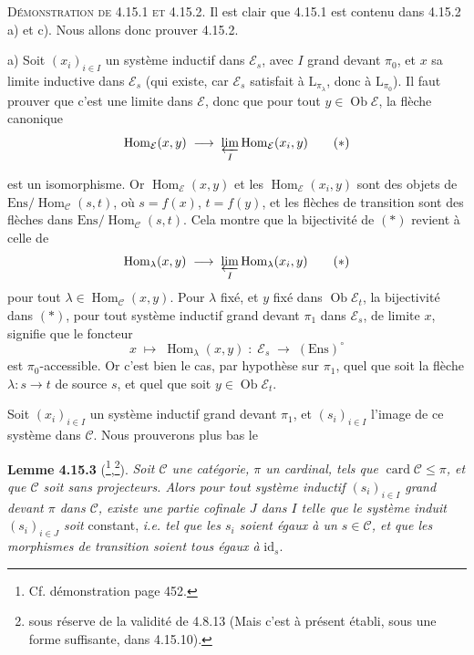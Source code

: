 \documentclass[11pt]{article}
\newcommand{\printedpage}[1]{\marginpar{\footnotesize p.~#1}}
\newcommand{\msp}[1]{\marginpar{\footnotesize [#1]}}
\newcommand{\Ob}{\operatorname{Ob}}
\newcommand{\card}{\operatorname{card}}
\newcommand{\Hom}{\operatorname{Hom}}
\newcommand{\id}{\mathrm{id}}
\newcommand{\Ens}{\mathrm{Ens}}
\newcommand{\cE}{\mathcal{E}}
\newcommand{\cC}{\mathcal{C}}
\begin{document}
\msp{page 427}
\textsc{Démonstration de 4.15.1 et 4.15.2.} Il est clair que 4.15.1 est contenu dans 4.15.2 a) et c). Nous allons donc prouver 4.15.2.

a) Soit $(x_i)_{i\in I}$ un système inductif dans $\cE_s$, avec $I$ grand devant $\pi_0$, et $x$ sa limite inductive dans $\cE_s$ (qui existe, car $\cE_s$ satisfait à $\mathrm{L}_{\pi_\lambda}$, donc à $\mathrm{L}_{\pi_0}$). Il faut prouver que c'est une limite dans $\cE$, donc que pour tout $y \in \Ob\cE$, la flèche canonique
\[
\Hom_{\cE}(x,y) \;\longrightarrow\; \varprojlim_{I} \Hom_{\cE}(x_i,y) \tag*{$(*)$}
\]

\printedpage{163}
est un isomorphisme. Or $\Hom_{\cE}(x,y)$ et les $\Hom_{\cE}(x_i,y)$ sont des objets de $\Ens/\Hom_{\cC}(s,t)$, où $s = f(x)$, $t = f(y)$, et les flèches de transition sont des flèches dans $\Ens/\Hom_{\cC}(s,t)$. Cela montre que la bijectivité de $(*)$ revient à celle de
\[
\Hom_\lambda(x,y) \;\longrightarrow\; \varprojlim_{I} \Hom_\lambda(x_i,y) \tag*{$(*)$}
\]
pour tout $\lambda \in \Hom_{\cC}(x,y)$. Pour $\lambda$ fixé, et $y$ fixé dans $\Ob\cE_t$, la bijectivité dans $(*)$, pour tout système inductif grand devant $\pi_1$ dans $\cE_s$, de limite $x$, signifie que le foncteur
\[
x \;\longmapsto\; \Hom_\lambda(x,y) \;:\; \cE_s \;\longrightarrow\; (\Ens)^\circ
\]
est $\pi_0$-accessible. Or c'est bien le cas, par hypothèse sur $\pi_1$, quel que soit la flèche $\lambda : s \longrightarrow t$ de source $s$, et quel que soit $y \in \Ob\cE_t$.

\msp{page 428}
Soit $(x_i)_{i\in I}$ un système inductif grand devant $\pi_1$, et $(s_i)_{i\in I}$ l'image de ce système dans $\cC$. Nous prouverons plus bas le

\textbf{Lemme 4.15.3} (\footnote{Cf. démonstration page 452.},\footnote{sous réserve de la validité de 4.8.13 (Mais c'est à présent établi, sous une forme suffisante, dans 4.15.10).}). \textit{Soit $\cC$ une catégorie, $\pi$ un cardinal, tels que} $\card\cC \leqslant \pi$\textit{, et que $\cC$ soit sans projecteurs. Alors pour tout système inductif $(s_i)_{i\in I}$ grand devant $\pi$ dans $\cC$, existe une partie cofinale $J$ dans $I$ telle que le système induit $(s_i)_{i\in J}$ soit} constant, \textit{i.e. tel que les $s_i$ soient égaux à un $s \in \cC$, et que les morphismes de transition soient tous égaux à} $\id_s$.
\end{document}
